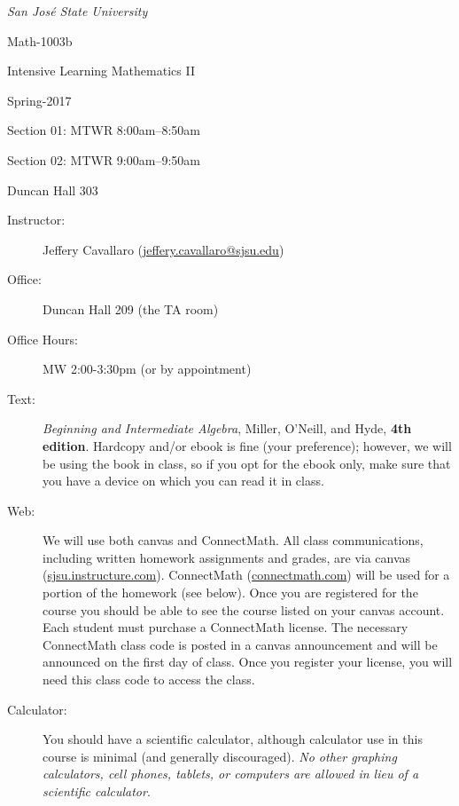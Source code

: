 \documentclass[letterpaper,12pt,fleqn]{article}
\begin{document}
\begin{center}
\emph{San Jos\'{e} State University}

\Large{Math-1003b

  Intensive Learning Mathematics II}\normalsize

\large{Spring-2017}\normalsize

Section 01: MTWR 8:00am--8:50am

Section 02: MTWR 9:00am--9:50am

Duncan Hall 303
\end{center}

\vspace{0.5in}

\begin{description}

\item[Instructor:] Jeffery Cavallaro
  (\url{jeffery.cavallaro@sjsu.edu})

\item[Office:] Duncan Hall 209 (the TA room)

\item[Office Hours:] MW 2:00-3:30pm (or by appointment)

\item[Text:] \emph{Beginning and Intermediate Algebra},
  Miller, O'Neill, and Hyde, \textbf{4th edition}. Hardcopy and/or ebook is fine
  (your preference); however, we will be using the book in class, so if you
  opt for the ebook only, make sure that you have a device on which you can read
  it in class.

\item[Web:] We will use both canvas and ConnectMath. All class communications,
  including written homework assignments and grades, are via canvas
  (\url{sjsu.instructure.com}). ConnectMath (\url{connectmath.com}) will be used
  for a portion of the homework (see below). Once you are registered for the
  course you should be able to see the course listed on your canvas account.
  Each student must purchase a ConnectMath license. The necessary ConnectMath
  class code is posted in a canvas announcement and will be announced on the
  first day of class. Once you register your license, you will need this class
  code to access the class.

\item[Calculator:] You should have a scientific calculator, although calculator use in
  this course is minimal (and generally discouraged). \emph{No other graphing
    calculators, cell phones, tablets, or computers are allowed in lieu of a scientific
    calculator}.


\end{description}
\end{document}
